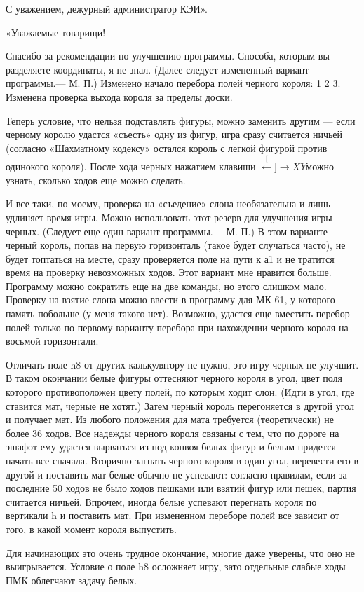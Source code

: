 \documentclass[11pt,a4paper,oneside]{article}
\def\XY{$\stackrel[\leftarrow]{\rightarrow}{XY}$}
\begin{document}
С уважением, дежурный администратор КЭИ».

«Уважаемые товарищи!

Спасибо за рекомендации по улучшению программы. Способа, которым вы разделяете координаты, я не знал. (Далее следует измененный вариант программы.— М. П.) Изменено начало перебора полей черного короля: 1 2 3. Изменена проверка выхода короля за пределы доски.

Теперь условие, что нельзя подставлять фигуры, можно заменить другим — если черному королю удастся «съесть» одну из фигур, игра сразу считается ничьей (согласно «Шахматному кодексу» остался король с легкой фигурой против одинокого короля). После хода черных нажатием клавиши \XY можно узнать, сколько ходов еще можно сделать.

И все-таки, по-моему, проверка на «съедение» слона необязательна и лишь удлиняет время игры. Можно использовать этот резерв для улучшения игры черных. (Следует еще один вариант программы.— М. П.) В этом варианте черный король, попав на первую горизонталь (такое будет случаться часто), не будет топтаться на месте, сразу проверяется поле на пути к а1 и не тратится время на проверку невозможных ходов. Этот вариант мне нравится больше. Программу можно сократить еще на две команды, но этого слишком мало. Проверку на взятие слона можно ввести в программу для МК-61, у которого память побольше (у меня такого нет). Возможно, удастся еще вместить перебор полей только по первому варианту перебора при нахождении черного короля на восьмой горизонтали.

Отличать поле h8 от других калькулятору не нужно, это игру черных не улучшит. В таком окончании белые фигуры оттесняют черного короля в угол, цвет поля которого противоположен цвету полей, по которым ходит слон. (Идти в угол, где ставится мат, черные не хотят.) Затем черный король перегоняется в другой угол и получает мат. Из любого положения для мата требуется (теоретически) не более 36 ходов. Все надежды черного короля связаны с тем, что по дороге на эшафот ему удастся вырваться из-под конвоя белых фигур и белым придется начать все сначала. Вторично загнать черного короля в один угол, перевести его в другой и поставить мат белые обычно не успевают: согласно правилам, если за последние 50 ходов не было ходов пешками или взятий фигур или пешек, партия считается ничьей. Впрочем, иногда белые успевают перегнать короля по вертикали h и поставить мат. При измененном переборе полей все зависит от того, в какой момент короля выпустить.

Для начинающих это очень трудное окончание, многие даже уверены, что оно не выигрывается. Условие о поле h8 осложняет игру, зато отдельные слабые ходы ПМК облегчают задачу белых.
\end{document}
